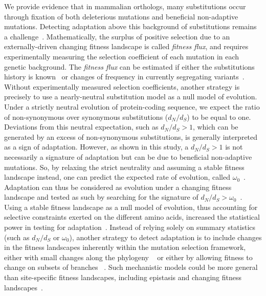 \documentclass{article}
\newcommand{\dn}{d_N}
\newcommand{\ds}{d_S}
\newcommand{\dnds}{\dn / \ds}
\begin{document}
    We provide evidence that in mammalian orthologs, many substitutions occur through fixation of both deleterious mutations and beneficial non-adaptive mutations.
    Detecting adaptation above this background of substitutions remains a challenge~\cite{kimura_evolutionary_1968, ohta_development_1996}.
    Mathematically, the surplus of positive selection due to an externally-driven changing fitness landscape is called \textit{fitness flux}, and requires experimentally measuring the selection coefficient of each mutation in each genetic background.
    The \textit{fitness flux} can be estimated if either the substitutions history is known~\cite{mustonen_fitness_2009} or changes of frequency in currently segregating variants~\cite{mustonen_fitness_2010}.
    Without experimentally measured selection coefficients, another strategy is precisely to use a nearly-neutral substitution model as a null model of evolution.
    Under a strictly neutral evolution of protein-coding sequence, we expect the ratio of non-synonymous over synonymous substitutions ($\dnds$) to be equal to one.
    Deviations from this neutral expectation, such as $\dnds > 1$, which can be generated by an excess of non-synonymous substitutions, is generally interpreted as a sign of adaptation.
    However, as shown in this study, a $\dnds > 1$ is not necessarily a signature of adaptation but can be due to beneficial non-adaptive mutations.
    So, by relaxing the strict neutrality and assuming a stable fitness landscape instead, one can predict the expected rate of evolution, called $\omega_0$~\cite{spielman_relationship_2015, dosreis_how_2015}.
    Adaptation can thus be considered as evolution under a changing fitness landscape and tested as such by searching for the signature of $\dnds > \omega_0$~\cite{cvijovic_fate_2015, rodrigue_detecting_2017, rodrigue_bayesian_2021}.
    Using a stable fitness landscape as a null model of evolution, thus accounting for selective constraints exerted on the different amino acids, increased the statistical power in testing for adaptation~\cite{latrille_genes_2023}.
    Instead of relying solely on summary statistics (such as $\dnds$ or $\omega_0$), another strategy to detect adaptation is to include changes in the fitness landscapes inherently within the mutation selection framework, either with small changes along the phylogeny ~\cite{tamuri_mutationselection_2021} or either by allowing fitness to change on subsets of branches ~\cite{kazmi_detecting_2019, stolyarova_senescence_2020}.
    Such mechanistic models could be more general than site-specific fitness landscapes, including epistasis and changing fitness landscapes~\cite{goldstein_sequence_2017, stolyarova_senescence_2020}.
\end{document}
